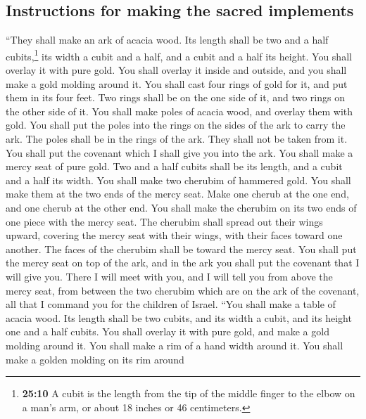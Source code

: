 \hypertarget{instructions-for-making-the-sacred-implements}{%
\subsection{Instructions for making the sacred
implements}\label{instructions-for-making-the-sacred-implements}}

 ``They shall make an ark of acacia wood. Its length
shall be two and a half cubits,\footnote{\textbf{25:10} A cubit is the
  length from the tip of the middle finger to the elbow on a man's arm,
  or about 18 inches or 46 centimeters.} its width a cubit and a half,
and a cubit and a half its height.  You shall overlay it
with pure gold. You shall overlay it inside and outside, and you shall
make a gold molding around it.  You shall cast four rings
of gold for it, and put them in its four feet. Two rings shall be on the
one side of it, and two rings on the other side of it. 
You shall make poles of acacia wood, and overlay them with gold.
 You shall put the poles into the rings on the sides of
the ark to carry the ark.  The poles shall be in the
rings of the ark. They shall not be taken from it.  You
shall put the covenant which I shall give you into the ark.
 You shall make a mercy seat of pure gold. Two and a half
cubits shall be its length, and a cubit and a half its width.
 You shall make two cherubim of hammered gold. You shall
make them at the two ends of the mercy seat.  Make one
cherub at the one end, and one cherub at the other end. You shall make
the cherubim on its two ends of one piece with the mercy seat.
 The cherubim shall spread out their wings upward,
covering the mercy seat with their wings, with their faces toward one
another. The faces of the cherubim shall be toward the mercy seat.
 You shall put the mercy seat on top of the ark, and in
the ark you shall put the covenant that I will give you. 
There I will meet with you, and I will tell you from above the mercy
seat, from between the two cherubim which are on the ark of the
covenant, all that I command you for the children of Israel.
 ``You shall make a table of acacia wood. Its length
shall be two cubits, and its width a cubit, and its height one and a
half cubits.  You shall overlay it with pure gold, and
make a gold molding around it.  You shall make a rim of a
hand width around it. You shall make a golden molding on its rim around
